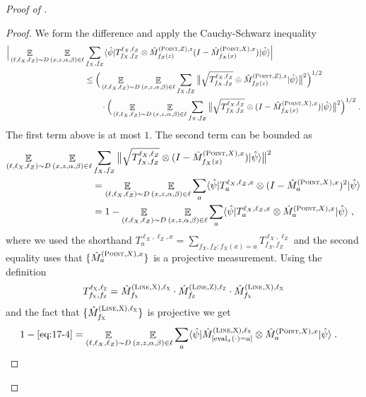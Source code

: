 \documentclass[11pt]{article}
\theoremstyle{definition}
\newcommand{\ket}[1]{|#1\rangle}
\newcommand{\bra}[1]{\langle#1|}
\newcommand{\Id}{\ensuremath{I}}
\newcommand{\ot}{\otimes}
\newcommand{\E}{\mathop{\mathbb{E}}\displaylimits}
\newcommand{\labelstyle}[1]{\ensuremath{\textsc{#1}}\xspace}
\newcommand{\xpt}{\labelstyle{X}}
\newcommand{\zpt}{\labelstyle{Z}}
\newcommand{\typestyle}[1]{\ensuremath{\textsc{#1}}\xspace}
\renewcommand{\line}{\mathbf{\ell}}
\newcommand{\Point}{\typestyle{Point}}
\newcommand{\Line}{\typestyle{Line}}
\newcommand{\eval}{\mathrm{eval}}
\begin{document}
\begin{proof}[Proof of ]
\begin{proof}
We form the difference and apply the Cauchy-Schwarz inequality
\begin{align*}
 \Big|\E_{(\line, \line_X, \line_Z) \sim D} \E_{(x,z,\alpha, \beta) \in \line} &\sum_{f_X, f_Z} \bra{\hat{\psi}} T^{\line_X, \line_Z}_{f_X, f_Z} \ot \hat{M}^{(\Point,Z),z}_{f_Z(z)} (\Id-\hat{M}^{(\Point,X),x}_{f_X(x)} ) \ket{\hat{\psi}}\Big|\\
&\leq \Big(\E_{(\line, \line_X, \line_Z) \sim D} \E_{(x,z,\alpha, \beta) \in \line} \sum_{f_X, f_Z} \big\| \sqrt{ T^{\line_X, \line_Z}_{f_X, f_Z}} \ot  \hat{M}^{(\Point,Z),z}_{f_Z(z)} \ket{\hat{\psi}}\big\|^2 \Big)^{1/2}\\
&\qquad\cdot \Big(\E_{(\line, \line_X, \line_Z) \sim D} \E_{(x,z,\alpha, \beta) \in \line} \sum_{f_X, f_Z} \big\| \sqrt{ T^{\line_X, \line_Z}_{f_X, f_Z}} \ot  (\Id-\hat{M}^{(\Point,X),x}_{f_X(x)}) \ket{\hat{\psi}}\big\|^2 \Big)^{1/2}\;.
\end{align*}
The first term above is at most $1$. The second term can be bounded as
\begin{align}
\E_{(\line, \line_X, \line_Z) \sim D} \E_{(x,z,\alpha, \beta) \in \line} &\sum_{f_X, f_Z} \big\| \sqrt{ T^{\line_X, \line_Z}_{f_X, f_Z}} \ot  (\Id-\hat{M}^{(\Point,X),x}_{f_X(x)}) \ket{\hat{\psi}}\big\|^2 \notag\\
&= \E_{(\line, \line_X, \line_Z) \sim D} \E_{(x,z,\alpha, \beta) \in \line} \sum_{a} \bra{\hat{\psi}}  T^{\line_X, \line_Z,x}_{a} \ot  (\Id-\hat{M}^{(\Point,X),x}_{a})^2 \ket{\hat{\psi}}\notag\\
&= 1-\E_{(\line, \line_X, \line_Z) \sim D} \E_{(x,z,\alpha, \beta) \in \line} \sum_{a} \bra{\hat{\psi}}  T^{\line_X, \line_Z,x}_{a} \ot \hat{M}^{(\Point,X),x}_{a} \ket{\hat{\psi}}\;,\label{eq:17-4}
\end{align}
where we used the shorthand $T^{\line_X, \line_Z,x}_{a} = \sum_{f_X,f_Z: f_X(x)=a} T^{\line_X, \line_Z}_{f_X, f_Z}$ and the second equality uses that $\{\hat{M}^{(\Point,X),x}_{a}\}$ is a projective measurement. Using the definition 
\[	T^{\line_\xpt,\line_\zpt}_{f_\xpt,f_\zpt} = \hat{M}^{(\Line,\xpt),\line_\xpt}_{f_\xpt} \cdot \hat{M}^{(\Line,\zpt),\line_\zpt}_{f_\zpt}  \cdot \hat{M}^{(\Line,\xpt),\line_\xpt}_{f_\xpt} \]
and the fact that $\{\hat{M}^{(\Line,\xpt),\line_\xpt}_{f_\xpt} \}$ is projective we get
\begin{align}
1-\eqref{eq:17-4}&=\E_{(\line, \line_X, \line_Z) \sim D} \E_{(x,z,\alpha, \beta) \in \line} \sum_{a} \bra{\hat{\psi}}  \hat{M}^{(\Line,\xpt),\line_\xpt}_{[\eval_x(\cdot)=a]} \ot \hat{M}^{(\Point,X),x}_{a} \ket{\hat{\psi}}\;.\label{eq:a17-8}

\end{align}
\end{proof}
\end{proof}
\end{document}

